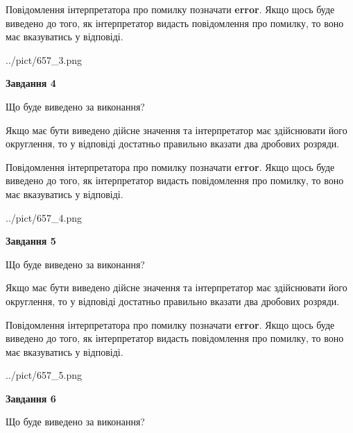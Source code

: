 \documentclass[12pt, ukrainian]{article}
\begin{document}
{\begin {Large}
Повідомлення інтерпретатора про помилку позначати \textbf{error}.
Якщо щось буде виведено до того, як інтерпретатор видасть повідомлення про помилку, 
то воно має вказуватись у відповіді. \par

\begin{center}
	{../pict/657_3.png}
\end{center}
\newpage

{\begin {center}\textbf{Завдання 4}\end {center}}\par
Що буде виведено за виконання? \par

Якщо має бути виведено дійсне значення та інтерпретатор має здійснювати його округлення, 
то у відповіді достатньо правильно вказати два дробових розряди.

Повідомлення інтерпретатора про помилку позначати \textbf{error}.
Якщо щось буде виведено до того, як інтерпретатор видасть повідомлення про помилку, 
то воно має вказуватись у відповіді. \par

\begin{center}
	{../pict/657_4.png}
\end{center}
\newpage

{\begin {center}\textbf{Завдання 5}\end {center}}\par
Що буде виведено за виконання? \par

Якщо має бути виведено дійсне значення та інтерпретатор має здійснювати його округлення, 
то у відповіді достатньо правильно вказати два дробових розряди.

Повідомлення інтерпретатора про помилку позначати \textbf{error}.
Якщо щось буде виведено до того, як інтерпретатор видасть повідомлення про помилку, 
то воно має вказуватись у відповіді. \par

\begin{center}
	{../pict/657_5.png}
\end{center}
\newpage

{\begin {center}\textbf{Завдання 6}\end {center}}\par
Що буде виведено за виконання? \par


\end{Large}}
\end{document}
